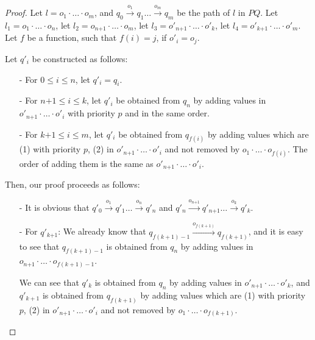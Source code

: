 \begin {proof}
Let $l=o_1 \cdot \ldots \cdot o_m$, and $q_0 \xrightarrow{o_1} q_1 \ldots \xrightarrow{o_m} q_m$ be the path of $l$ in $\textit{PQ}$. Let $l_1 = o_1 \cdot \ldots \cdot o_n$, let $l_2 = o_{\textit{n+1}} \cdot \ldots \cdot o_m$, let $l_3 = o'_{\textit{n+1}} \cdot \ldots \cdot o'_k$, let $l_4 = o'_{\textit{k+1}} \cdot \ldots \cdot o'_m$. Let $f$ be a function, such that $f(i)=j$, if $o'_i = o_j$.

Let $q'_i$ be constructed as follows:

\begin{itemize}
\setlength{\itemsep}{0.5pt}
\item[-] For $0 \leq i \leq n$, let $q'_i = q_i$.

\item[-] For $\textit{n+1} \leq i \leq k$, let $q'_i$ be obtained from $q_n$ by adding values in $o'_{\textit{n+1}} \cdot \ldots \cdot o'_i$ with priority $p$ and in the same order.

\item[-] For $\textit{k+1} \leq i \leq m$, let $q'_i$ be obtained from $q_{f(i)}$ by adding values which are (1) with priority $p$, (2) in $o'_{\textit{n+1}} \cdot \ldots \cdot o'_i$ and not removed by $o_1 \cdot \ldots \cdot o_{f(i)}$. The order of adding them is the same as $o'_{\textit{n+1}} \cdot \ldots \cdot o'_i$.
\end{itemize}

Then, our proof proceeds as follows:

\begin{itemize}
\setlength{\itemsep}{0.5pt}
\item[-] It is obvious that $q'_0 \xrightarrow{o_1} q'_1 \ldots \xrightarrow{o_n} q'_n$ and $q'_n \xrightarrow{o_{\textit{n+1}}} q'_{\textit{n+1}} \ldots \xrightarrow{o_k} q'_k$.

\item[-] For $q'_{\textit{k+1}}$: We already know that $q_{f(k+1)-1} \xrightarrow{o_{f(k+1)}} q_{f(k+1)}$, and it is easy to see that $q_{f(k+1)-1}$ is obtained from $q_n$ by adding values in $o_{\textit{n+1}} \cdot \ldots \cdot o_{f(k+1)-1}$.

    We can see that $q'_k$ is obtained from $q_n$ by adding values in $o'_{\textit{n+1}} \cdot \ldots \cdot o'_k$, and $q'_{k+1}$ is obtained from $q_{f(k+1)}$ by adding values which are (1) with priority $p$, (2) in $o'_{\textit{n+1}} \cdot \ldots \cdot o'_i$ and not removed by $o_1 \cdot \ldots \cdot o_{f(k+1)}$.


\end{itemize}
\end{proof}
